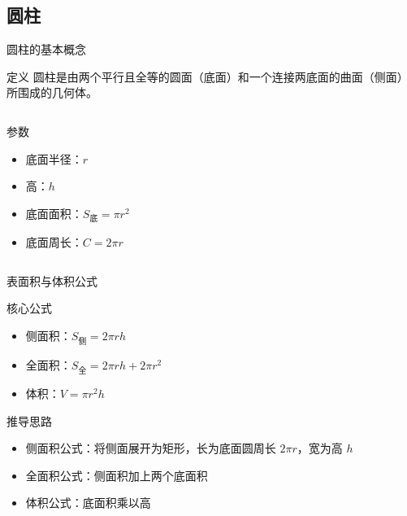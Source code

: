 
\subsection{圆柱}
\begin{frame}{圆柱的基本概念}
    \begin{block}{定义}
        圆柱是由两个平行且全等的圆面（底面）和一个连接两底面的曲面（侧面）所围成的几何体。
    \end{block}
    
    \begin{columns}
        \begin{exampleblock}{参数}
            \begin{itemize}
                \item 底面半径：\( r \)
                \item 高：\( h \)
                \item 底面面积：\( S_{\text{底}} = \pi r^2 \)
                \item 底面周长：\( C = 2\pi r \)
            \end{itemize}
        \end{exampleblock}
        
   

    \end{columns}
\end{frame}



\begin{frame}{表面积与体积公式}
    \begin{block}{核心公式}
        \begin{itemize}
            \item 侧面积：\( S_{\text{侧}} = 2\pi r h \)
            \item 全面积：\( S_{\text{全}} = 2\pi r h + 2\pi r^2 \)
            \item 体积：\( V = \pi r^2 h \)
        \end{itemize}
    \end{block}
    
    \begin{exampleblock}{推导思路}
        \begin{itemize}
            \item 侧面积公式：将侧面展开为矩形，长为底面圆周长 \( 2\pi r \)，宽为高 \( h \)
            \item 全面积公式：侧面积加上两个底面积
            \item 体积公式：底面积乘以高
        \end{itemize}
    \end{exampleblock}
\end{frame}

